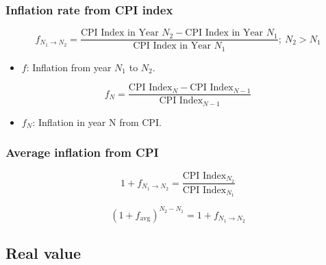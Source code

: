 \subsubsection{Inflation rate from CPI index}
    \begin{definition}
        \begin{equation}
            f_{N_1 \rightarrow N_2} = \frac{\text{CPI Index in Year } N_2 - \text{CPI Index in Year } N_1}{\text{CPI Index in Year } N_1};\: N_2 > N_1
        \end{equation}
        \begin{itemize}
            \item \(f\): Inflation from year $N_1$ to $N_2$.
        \end{itemize}
        \begin{equation}
            f_N = \frac{\text{CPI Index}_{N} - \text{CPI Index}_{N-1}}{\text{CPI Index}_{N-1}}
        \end{equation}
        
        \begin{itemize}
            \item $f_N$: Inflation in year N from CPI.
        \end{itemize}
    \end{definition}

\subsubsection{Average inflation from CPI}
    \begin{definition}
        \begin{equation}
            1 + f_{N_1 \rightarrow N_2} = \frac{\text{CPI Index}_{N_2}}{\text{CPI Index}_{N_1}}
        \end{equation}
        
        \begin{equation}
            (1 + f_{\text{avg}})^{N_2 - N_1} = 1 + f_{N_1 \rightarrow N_2}
        \end{equation}
    \end{definition}

\subsection{Real value}

